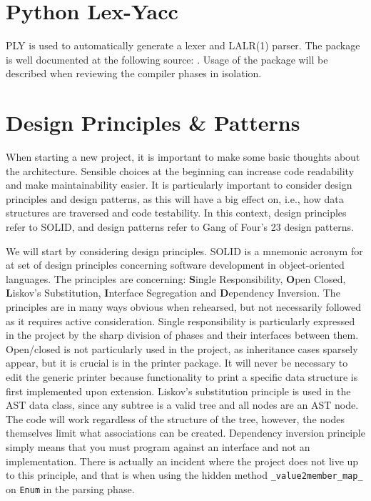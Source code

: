 \section{Python Lex-Yacc}
PLY is used to automatically generate a lexer and LALR(1) parser. The package is well documented at the following source: \cite{ply}. Usage of the package will be described when reviewing the compiler phases in isolation.

\section{Design Principles \& Patterns}
When starting a new project, it is important to make some basic thoughts about the architecture. Sensible choices at the beginning can increase code readability and make maintainability easier. It is particularly important to consider design principles and design patterns, as this will have a big effect on, i.e., how data structures are traversed and code testability. In this context, design principles refer to SOLID, and design patterns refer to Gang of Four's 23 design patterns.

We will start by considering design principles. SOLID is a mnemonic acronym for at set of design principles concerning software development in object-oriented languages. The principles are concerning: \textbf{S}ingle Responsibility, \textbf{O}pen Closed, \textbf{L}iskov's Substitution, \textbf{I}nterface Segregation and \textbf{D}ependency Inversion. The principles are in many ways obvious when rehearsed, but not necessarily followed as it requires active consideration. Single responsibility is particularly expressed in the project by the sharp division of phases and their interfaces between them. Open/closed is not particularly used in the project, as inheritance cases sparsely appear, but it is crucial is in the printer package. It will never be necessary to edit the generic printer because functionality to print a specific data structure is first implemented upon extension. Liskov's substitution principle is used in the AST data class, since any subtree is a valid tree and all nodes are an AST node. The code will work regardless of the structure of the tree, however, the nodes themselves limit what associations can be created. Dependency inversion principle simply means that you must program against an interface and not an implementation. There is actually an incident where the project does not live up to this principle, and that is when using the hidden method \texttt{\_value2member\_map\_} on \texttt{Enum} in the parsing phase.


